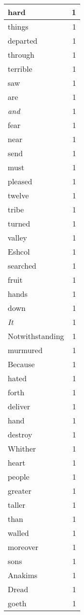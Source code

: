 \begin{center}
\begin{longtable}{l|r}
hard & 1 \\ \hline
things & 1 \\ \hline
departed & 1 \\ \hline
through & 1 \\ \hline
terrible & 1 \\ \hline
saw & 1 \\ \hline
are & 1 \\ \hline
\emph{and} & 1 \\ \hline
fear & 1 \\ \hline
near & 1 \\ \hline
send & 1 \\ \hline
must & 1 \\ \hline
pleased & 1 \\ \hline
twelve & 1 \\ \hline
tribe & 1 \\ \hline
turned & 1 \\ \hline
valley & 1 \\ \hline
Eshcol & 1 \\ \hline
searched & 1 \\ \hline
fruit & 1 \\ \hline
hands & 1 \\ \hline
down & 1 \\ \hline
\emph{It} & 1 \\ \hline
Notwithstanding & 1 \\ \hline
murmured & 1 \\ \hline
Because & 1 \\ \hline
hated & 1 \\ \hline
forth & 1 \\ \hline
deliver & 1 \\ \hline
hand & 1 \\ \hline
destroy & 1 \\ \hline
Whither & 1 \\ \hline
heart & 1 \\ \hline
people & 1 \\ \hline
greater & 1 \\ \hline
taller & 1 \\ \hline
than & 1 \\ \hline
walled & 1 \\ \hline
moreover & 1 \\ \hline
sons & 1 \\ \hline
Anakims & 1 \\ \hline
Dread & 1 \\ \hline
goeth & 1 \\ \hline

\end{longtable}
\end{center}
